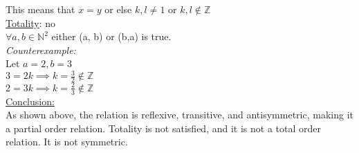 \documentclass{article}
\theoremstyle{definition}
\begin{document}
\begin{enumerate}[label = \alph*)]
\begin{enumerate}
        This means that $x=y$ or else $k, l \neq 1$ or $k, l \notin \mathbb{Z}$\\
        \underline{Totality}: no\\
        $\forall a, b \in \mathbb{N}^2$ either (a, b) or (b,a) is true.\\
        \textit{Counterexample:}\\
        Let $a=2, b=3$\\
        $3=2k \implies k=\frac{3}{2} \notin \mathbb{Z}$\\
        $2=3k \implies k=\frac{2}{3} \notin \mathbb{Z}$\\
        \underline{Conclusion:}\\
        As shown above, the relation is reflexive, transitive, and antisymmetric, making it a partial order relation. Totality is not satisfied, and it is not a total order relation. It is not symmetric.
    \end{enumerate}
    

\end{enumerate}
\end{document}
